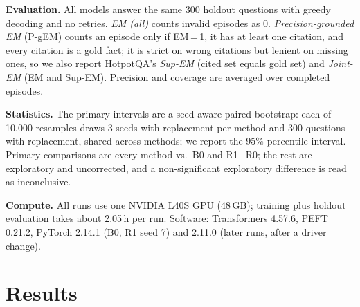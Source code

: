 \documentclass[conference]{IEEEtran}
\newcommand{\pgem}{P-gEM}
\begin{document}
\textbf{Evaluation.} All models answer the same 300 holdout questions with greedy decoding and no retries. \emph{EM (all)} counts invalid episodes as 0. \emph{Precision-grounded EM} (\pgem) counts an episode only if EM\,=\,1, it has at least one citation, and every citation is a gold fact; it is strict on wrong citations but lenient on missing ones, so we also report HotpotQA's \emph{Sup-EM} (cited set equals gold set) and \emph{Joint-EM} (EM and Sup-EM). Precision and coverage are averaged over completed episodes.

\textbf{Statistics.} The primary intervals are a seed-aware paired bootstrap: each of 10{,}000 resamples draws 3 seeds with replacement per method and 300 questions with replacement, shared across methods; we report the 95\% percentile interval. Primary comparisons are every method vs.\ B0 and R1$-$R0; the rest are exploratory and uncorrected, and a non-significant exploratory difference is read as inconclusive.

\textbf{Compute.} All runs use one NVIDIA L40S GPU (48\,GB); training plus holdout evaluation takes about 2.05\,h per run. Software: Transformers 4.57.6, PEFT 0.21.2, PyTorch 2.14.1 (B0, R1 seed 7) and 2.11.0 (later runs, after a driver change).

\section{Results}
\label{sec:results}
\end{document}
